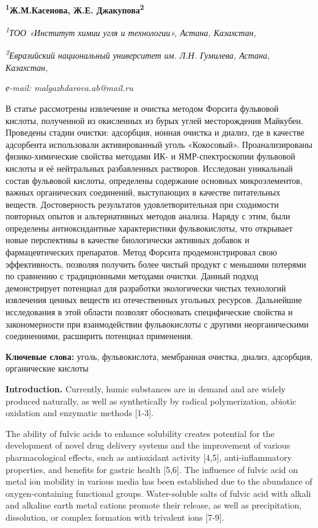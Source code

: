 {\bfseries \textsuperscript{1}Ж.М.Касенова, Ж.Е.
Джакупова\textsuperscript{2}}

\emph{\textsuperscript{1}ТОО «Институт химии угля и технологии», Астана,
Казахстан,}

\emph{\textsuperscript{2}Евразийский национальный университет им. Л.Н.
Гумилева, Астана, Казахстан,}

\emph{е-mail: malgazhdarova.ab@mail.ru}

В статье рассмотрены извлечение и очистка методом Форсита фульвовой
кислоты, полученной из окисленных из бурых углей месторождения Майкубен.
Проведены стадии очистки: адсорбция, ионная очистка и диализ, где в
качестве адсорбента использовали активированный уголь «Кокосовый».
Проанализированы физико-химические свойства методами ИК- и
ЯМР-спектроскопии фульвовой кислоты и её нейтральных разбавленных
растворов. Исследован уникальный состав фульвовой кислоты, определены
содержание основных микроэлементов, важных органических соединений,
выступающих в качестве питательных веществ. Достоверность результатов
удовлетворительная при сходимости повторных опытов и альтернативных
методов анализа. Наряду с этим, были определены антиоксидантные
характеристики фульвокислоты, что открывает новые перспективы в качестве
биологически активных добавок и фармацевтических препаратов. Метод
Форсита продемонстрировал свою эффективность, позволяя получить более
чистый продукт с меньшими потерями по сравнению с традиционными методами
очистки. Данный подход демонстрирует потенциал для разработки
экологически чистых технологий извлечения ценных веществ из
отечественных угольных ресурсов. Дальнейшие исследования в этой области
позволят обосновать специфические свойства и закономерности при
взаимодействии фульвокислоты с другими неорганическими соединениями,
расширить потенциал применения.

{\bfseries Ключевые слова:} уголь, фульвокислота, мембранная очистка,
диализ, адсорбция, органические кислоты

{\bfseries Introduction.} Currently, humic substances are in demand and are
widely produced naturally, as well as synthetically by radical
polymerization, abiotic oxidation and enzymatic methods {[}1-3{]}.

The ability of fulvic acids to enhance solubility creates potential for
the development of novel drug delivery systems and the improvement of
various pharmacological effects, such as antioxidant activity {[}4,5{]},
anti-inflammatory properties, and benefits for gastric health {[}5,6{]}.
The influence of fulvic acid on metal ion mobility in various media has
been established due to the abundance of oxygen-containing functional
groups. Water-soluble salts of fulvic acid with alkali and alkaline
earth metal cations promote their release, as well as precipitation,
dissolution, or complex formation with trivalent ions {[}7-9{]}.

